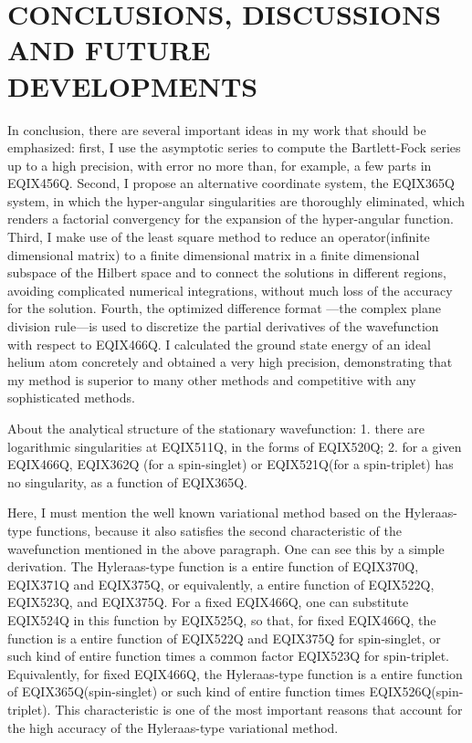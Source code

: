 \section{CONCLUSIONS, DISCUSSIONS AND FUTURE DEVELOPMENTS}

In conclusion, there are several important ideas in my work that
should be emphasized: first, I use the asymptotic series to compute
the Bartlett-Fock series up to a high precision, with error no more than,
for example, a few parts in EQIX456Q. Second, I propose an alternative
coordinate system, the EQIX365Q system, in which the hyper-angular
singularities are thoroughly eliminated, which renders a factorial
convergency for the expansion of the hyper-angular function. Third,
I make use of the least square method to reduce an operator(infinite
dimensional matrix) to a finite dimensional matrix in a finite dimensional
subspace of the Hilbert space and to connect the solutions in different
regions, avoiding complicated numerical integrations, without much loss
of the accuracy for the solution. Fourth, the optimized difference format
---the complex plane division rule---is used to discretize the partial
derivatives of the wavefunction with respect to EQIX466Q. I calculated the
ground state energy of an ideal helium atom concretely and obtained a very
high precision, demonstrating that my method is superior to many other
methods and competitive with any sophisticated methods.

About the analytical structure of the stationary wavefunction:
1. there are logarithmic singularities at EQIX511Q, in the forms
of EQIX520Q; 2. for a given EQIX466Q, EQIX362Q (for a spin-singlet)
or EQIX521Q(for a spin-triplet) has no singularity,
as a function of EQIX365Q.

Here, I must mention the well known variational method based on
the Hyleraas-type functions, because it also
satisfies the second characteristic of
the wavefunction mentioned in the above paragraph.
One can see this by
a simple derivation. The Hyleraas-type function is a entire function
of EQIX370Q, EQIX371Q and EQIX375Q, or equivalently, a entire function
of EQIX522Q, EQIX523Q, and EQIX375Q. For a fixed EQIX466Q,
one can substitute EQIX524Q in this function by
EQIX525Q, so that, for fixed EQIX466Q,
the function is a entire function
of EQIX522Q and EQIX375Q for spin-singlet, or such kind of entire
function times a common factor EQIX523Q for spin-triplet. Equivalently,
for fixed EQIX466Q, the Hyleraas-type function is a entire function of
EQIX365Q(spin-singlet) or such kind of entire function times
EQIX526Q(spin-triplet).
This characteristic is one of the most important reasons that
account for the high accuracy of the Hyleraas-type variational method.

